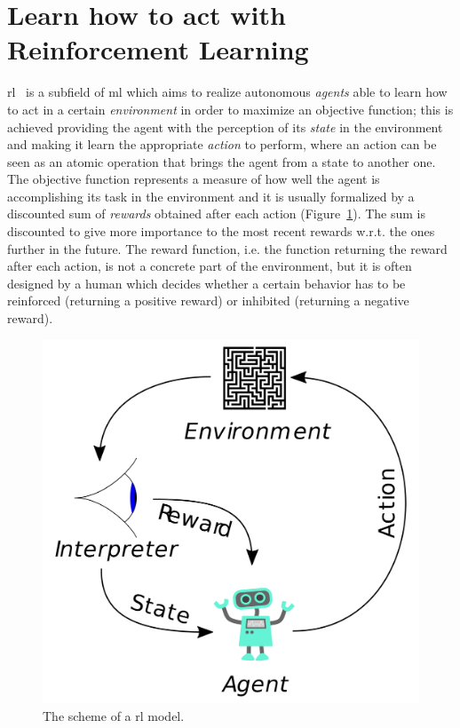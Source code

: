 \section{Learn how to act with Reinforcement Learning}
\gls{rl}~\cite{sutton1998reinforcement} is a subfield of \gls{ml} which aims to realize autonomous \textit{agents} able to learn how to act in a certain \textit{environment} in order to maximize an objective function; this is achieved providing the agent with the perception of its \textit{state} in the environment and making it learn the appropriate \textit{action} to perform, where an action can be seen as an atomic operation that brings the agent from a state to another one. The objective function represents a measure of how well the agent is accomplishing its task in the environment and it is usually formalized by a discounted sum of \textit{rewards} obtained after each action (Figure~\ref{F:rl}). The sum is discounted to give more importance to the most recent rewards w.r.t. the ones further in the future. The reward function, i.e. the function returning the reward after each action, is not a concrete part of the environment, but it is often designed by a human which decides whether a certain behavior has to be reinforced (returning a positive reward) or inhibited (returning a negative reward).

\begin{figure}[t]
\begin{minipage}{\textwidth}
\begin{center}
  \includegraphics[scale=.1]{img/rl.png}
\end{center}
\end{minipage}
\caption[Reinforcement Learning problem scheme]{The scheme of a \gls{rl} model.}\label{F:rl}
\end{figure}

